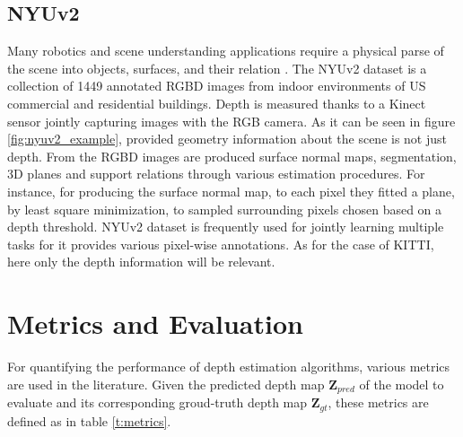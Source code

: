 \subsection{NYUv2}
Many robotics and scene understanding applications require a physical parse of the scene into objects, surfaces, and their relation \cite{NYUv2}.
The NYUv2 dataset \cite{NYUv2} is a collection of 1449 annotated RGBD images from indoor environments of US commercial and residential buildings.
Depth is measured thanks to a Kinect sensor jointly capturing images with the RGB camera.
As it can be seen in figure \ref{fig:nyuv2_example}, provided geometry information about the scene is not just depth.
From the RGBD images are produced surface normal maps, segmentation, 3D planes and support relations through various estimation procedures.
For instance, for producing the surface normal map, to each pixel they fitted a plane, by least square minimization, to sampled surrounding pixels chosen based on a depth threshold.
NYUv2 dataset is frequently used for jointly learning multiple tasks for it provides various pixel-wise annotations.
As for the case of KITTI, here only the depth information will be relevant.

\section{Metrics and Evaluation}
\label{sec:metrics}

For quantifying the performance of depth estimation algorithms, various metrics are used in the literature.
Given the predicted depth map $\mathbf{Z}_{pred}$ of the model to evaluate and its corresponding groud-truth depth map $\mathbf{Z}_{gt}$, these metrics are defined as in table \ref{t:metrics}.


